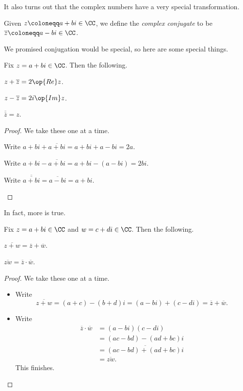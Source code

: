 It also turns out that the complex numbers have a very special transformation.
\begin{definition}[Conjugate]
	Given $z\coloneqq a+bi\in\CC$, we define the \textit{complex conjugate} to be $\overline z\coloneqq a-bi\in\CC$.
\end{definition}
We promised conjugation would be special, so here are some special things.
\begin{proposition} \label{prop:accessreandim}
	Fix $z=a+bi\in\CC$. Then the following.
	\begin{listalph}
		\item $z+\overline z=2\op{Re}z$.
		\item $z-\overline z=2i\op{Im}z$.
		\item $\overline{\overline z}=z$.
	\end{listalph}
\end{proposition}
\begin{proof}
	We take these one at a time.
	\begin{listalph}
		\item Write $a+bi+\overline{a+bi}=a+bi+a-bi=2a$.
		\item Write $a+bi-\overline{a+bi}=a+bi-(a-bi)=2bi$.
		\item Write $\overline{\overline{a+bi}}=\overline{a-bi}=a+bi$.
		\qedhere
	\end{listalph}
\end{proof}
In fact, more is true.
\begin{proposition}
	Fix $z=a+bi\in\CC$ and $w=c+di\in\CC$. Then the following.
	\begin{listalph}
		\item $\overline{z+w}=\overline z+\overline w$.
		\item $\overline{zw}=\overline z\cdot\overline w$.
	\end{listalph}
\end{proposition}
\begin{proof}
	We take these one at a time.
	\begin{itemize}
		\item Write
		\[\overline{z+w}=(a+c)-(b+d)i=(a-bi)+(c-di)=\overline z+\overline w.\]
		\item Write
		\begin{align*}
			\overline z\cdot\overline w &= (a-bi)(c-di) \\
			&= (ac-bd)-(ad+bc)i \\
			&= \overline{(ac-bd)+(ad+bc)i} \\
			&= \overline{zw}.
		\end{align*}
		This finishes.
		\qedhere
	\end{itemize}
\end{proof}

